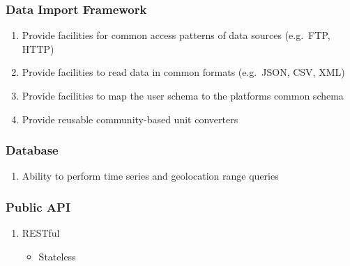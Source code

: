 \subsubsection{Data Import Framework}\label{data-import-framework}

\begin{enumerate}
\def\labelenumi{\arabic{enumi}.}
\tightlist
\item
  Provide facilities for common access patterns of data sources
  (e.g.~FTP, HTTP)
\item
  Provide facilities to read data in common formats (e.g.~JSON, CSV,
  XML)
\item
  Provide facilities to map the user schema to the platforms common
  schema
\item
  Provide reusable community-based unit converters
\end{enumerate}

\subsubsection{Database}\label{database}

\begin{enumerate}
\def\labelenumi{\arabic{enumi}.}
\tightlist
\item
  Ability to perform time series and geolocation range queries
\end{enumerate}

\subsubsection{Public API}\label{public-api}

\begin{enumerate}
\def\labelenumi{\arabic{enumi}.}
\tightlist
\item
  RESTful

  \begin{itemize}
  \tightlist
  \item
    Stateless
  \end{itemize}
\end{enumerate}
